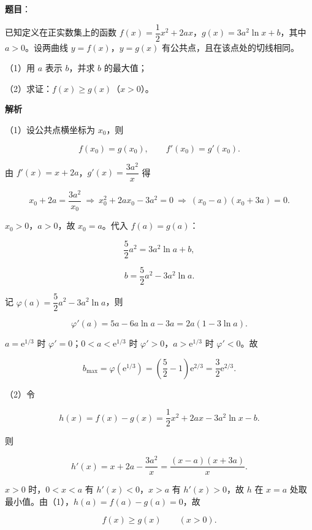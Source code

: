 \begin{answer}

\textbf{题目}：

已知定义在正实数集上的函数 $f(x)=\dfrac12x^2+2ax$，$g(x)=3a^2\ln x+b$，其中 $a>0$。设两曲线 $y=f(x)$，$y=g(x)$ 有公共点，且在该点处的切线相同。

（1）用 $a$ 表示 $b$，并求 $b$ 的最大值；

（2）求证：$f(x)\geqslant g(x)$（$x>0$）。

\textbf{解析}

（1）设公共点横坐标为 $x_0$，则

\nopagebreak[4]
\[f(x_0)=g(x_0),\qquad f'(x_0)=g'(x_0).\]

由 $f'(x)=x+2a$，$g'(x)=\dfrac{3a^2}x$ 得

\nopagebreak[4]
\[x_0+2a=\frac{3a^2}{x_0}\ \Longrightarrow\ x_0^2+2ax_0-3a^2=0\ \Longrightarrow\ (x_0-a)(x_0+3a)=0.\]

$x_0>0$，$a>0$，故 $x_0=a$。代入 $f(a)=g(a)$：

\nopagebreak[4]
\[\frac52a^2=3a^2\ln a+b,\]

\nopagebreak[4]
\[b=\frac52a^2-3a^2\ln a.\]

记 $\varphi(a)=\dfrac52a^2-3a^2\ln a$，则

\nopagebreak[4]
\[\varphi'(a)=5a-6a\ln a-3a=2a(1-3\ln a).\]

$a=\mathrm e^{1/3}$ 时 $\varphi'=0$；$0<a<\mathrm e^{1/3}$ 时 $\varphi'>0$，$a>\mathrm e^{1/3}$ 时 $\varphi'<0$。故

\nopagebreak[4]
\[b_{\max}=\varphi\left(\mathrm e^{1/3}\right)=\left(\frac52-1\right)\mathrm e^{2/3}=\frac32\mathrm e^{2/3}.\]

（2）令

\nopagebreak[4]
\[h(x)=f(x)-g(x)=\frac12x^2+2ax-3a^2\ln x-b.\]

则

\nopagebreak[4]
\[h'(x)=x+2a-\frac{3a^2}x=\frac{(x-a)(x+3a)}x.\]

$x>0$ 时，$0<x<a$ 有 $h'(x)<0$，$x>a$ 有 $h'(x)>0$，故 $h$ 在 $x=a$ 处取最小值。由（1），$h(a)=f(a)-g(a)=0$，故

\nopagebreak[4]
\[f(x)\geqslant g(x)\qquad(x>0).\]


\end{answer}
